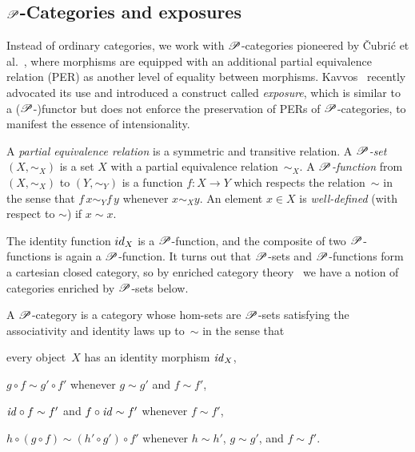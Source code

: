 \documentclass[a4paper,UKenglish,numberwithinsect,cleveref,thm-restate,draft]{lipics-v2021}
\numberwithin{equation}{section}
\theoremstyle{definition}
\theoremstyle{plain}
\begin{document}
\subsection{\texorpdfstring{$\mathscr{P}$}{P}-Categories and exposures}
Instead of ordinary categories, we work with $\mathscr{P}$-categories pioneered by \v{C}ubri\'c et al.~\cite{Cubric1998a}, where morphisms are equipped with an additional partial equivalence relation (PER) as another level of equality between morphisms.
Kavvos~\cite{Kavvos2017b} recently advocated its use and introduced a construct called \emph{exposure}, which is similar to a ($\mathscr{P}$-)functor but does not enforce the preservation of PERs of $\mathscr{P}$-categories, to manifest the essence of intensionality.

\begin{definition}
  A \emph{partial equivalence relation} is a symmetric and transitive relation.
  A \emph{$\mathscr{P}$-set} $(X, \sim_X)$ is a set $X$ with a partial equivalence relation~$\sim_X$.
  A \emph{$\mathscr{P}$-function} from $(X, \sim_X)$ to $(Y, \sim_Y)$ is a function $f\colon X \to Y$ which respects the relation~$\sim$ in the sense that $f\,x \sim_Y f\,y$ whenever $x \sim_X y$.
  An element $x \in X$ is \emph{well-defined} (with respect to $\sim$) if $x \sim x$.
\end{definition}
The identity function $\idfunc[X]$ is a $\mathscr{P}$-function, and the composite of two $\mathscr{P}$-functions is again a $\mathscr{P}$-function.
It turns out that $\mathscr{P}$-sets and $\mathscr{P}$-functions form a cartesian closed category, so by enriched category theory~\cite{Kelly1982} we have a notion of categories enriched by $\mathscr{P}$-sets below.

\begin{definition}
  A $\mathscr{P}$-category is a category whose hom-sets are $\mathscr{P}$-sets satisfying the associativity and identity laws up to~$\sim$ in the sense that 
  \begin{romanenumerate}
  \item every object~$X$ has an identity morphism $\mathit{id}_X$, 
  \item $g \circ f \sim g' \circ f'$ whenever $g\sim g'$ and $f \sim f'$,
  \item $\mathit{id} \circ f \sim f'$ and $f \circ \mathit{id} \sim f'$ whenever $f \sim f'$,
  \item $h \circ (g \circ f) \sim (h' \circ g') \circ f'$ whenever $h\sim h'$, $g \sim g'$, and $f \sim f'$.
  \end{romanenumerate}
\end{definition}
\end{document}
